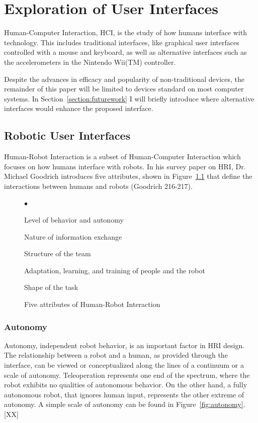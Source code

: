 \chapter{Exploration of User Interfaces}
\label{chapter:ui}

Human-Computer Interaction, HCI, is the study of how humans interface with technology. This includes traditional interfaces, like graphical user interfaces controlled with a mouse and keyboard, as well as alternative interfaces such as the accelerometers in the Nintendo Wii(TM) controller.

Despite the advances in efficacy and popularity of non-traditional devices, the remainder of this paper will be limited to devices standard on most computer systems. In Section~\ref{section:futurework} I will briefly introduce where alternative interfaces would enhance the proposed interface.

\section{Robotic User Interfaces}

Human-Robot Interaction is a subset of Human-Computer Interaction which focuses on how humans interface with robots. In his survey paper on HRI, Dr. Michael Goodrich introduces five attributes, shown in Figure~\ref{fig:five-attributes} that define the interactions between humans and robots (Goodrich 216-217).

\begin{figure}[ht]
	\makebox[\textwidth]{\hrulefill}
	\begin{list}{$\bullet$}
		\item Level of behavior and autonomy
		\item Nature of information exchange
		\item Structure of the team
		\item Adaptation, learning, and training of people and the robot
		\item Shape of the task
	\end{list}
	\makebox[\textwidth]{\hrulefill}
	\caption{Five attributes of Human-Robot Interaction \label{fig:five-attributes}}
\end{figure}


\subsection{Autonomy}

Autonomy, independent robot behavior, is an important factor in HRI design. The relationship between a robot and a human, as provided through the interface, can be viewed or conceptualized along the lines of a continuum or a scale of autonomy. Teleoperation represents one end of the spectrum, where the robot exhibits no qualities of autonomous behavior. On the other hand, a fully autonomous robot, that ignores human input, represents the other extreme of autonomy. A simple scale of autonomy can be found in Figure~\ref{fig:autonomy}. [XX]


